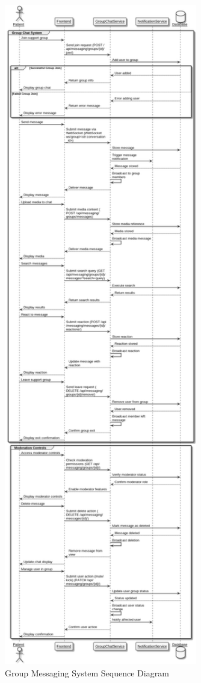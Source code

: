 \begin{figure}[H]
    \centering
    \includegraphics[width=0.75\textwidth]{Messaging_Sequence_Diagram.png}
    \caption{Group Messaging System Sequence Diagram}
    \label{fig:messaging-sequence-diagram}
\end{figure}

